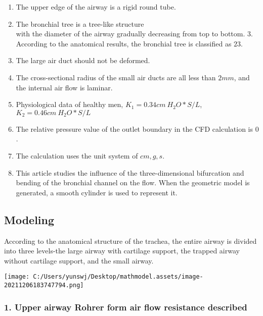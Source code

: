 \documentclass[
]{article}
\begin{document}
\begin{enumerate}
\def\labelenumi{\arabic{enumi}.}
\item
  The upper edge of the airway is a rigid round tube.
\item
  The bronchial tree is a tree-like structure \\
  with the diameter of the airway gradually decreasing from top to
  bottom. 3. According to the anatomical results, the bronchial tree is
  classified as \(23\).
\item
  The large air duct should not be deformed.
\item
  The cross-sectional radius of the small air ducts are all less than
  \(2mm\), and the internal air flow is laminar.
\item
  Physiological data of healthy men, \(K _1 = 0.34 cm ~ H _2O*S/L\),
  \(K _2 = 0.46 cm ~ H _2O*S/L\)
\item
  The relative pressure value of the outlet boundary in the CFD
  calculation is \(0\).
\item
  The calculation uses the unit system of \(cm, g, s\).
\item
  This article studies the influence of the three-dimensional
  bifurcation and bending of the bronchial channel on the flow. When the
  geometric model is generated, a smooth cylinder is used to represent
  it.
\end{enumerate}

\hypertarget{modeling}{%
\subsection{\texorpdfstring{Modeling }{Modeling }}\label{modeling}}

According to the anatomical structure of the trachea, the entire airway
is divided into three levels-the large airway with cartilage support,
the trapped airway without cartilage support, and the small airway.

\texttt{[image: C:/Users/yunswj/Desktop/mathmodel.assets/image-20211206183747794.png]}

\hypertarget{1-upper-airway-rohrer-form-air-flow-resistance-described}{%
\subsubsection{\texorpdfstring{1. Upper airway Rohrer form air flow
resistance described
}{1. Upper airway Rohrer form air flow resistance described }}\label{1-upper-airway-rohrer-form-air-flow-resistance-described}}
\end{document}
